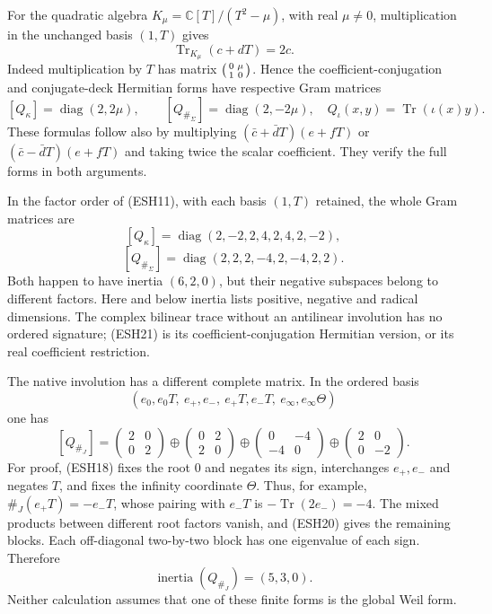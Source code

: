 \documentclass[
  10pt,
  a4paper,
]{article}
\begin{document}
For the quadratic algebra \(K_\mu=\mathbb C[T]/(T^2-\mu)\), with real
\(\mu\ne0\), multiplication in the unchanged basis \((1,T)\) gives \[
\operatorname{Tr}_{K_\mu}(c+dT)=2c.
\tag{ESH19}
\] Indeed multiplication by \(T\) has matrix
\(\begin{psmallmatrix}0&\mu\\1&0\end{psmallmatrix}\). Hence the
coefficient-conjugation and conjugate-deck Hermitian forms have
respective Gram matrices \[
[Q_\kappa]=\operatorname{diag}(2,2\mu),\qquad
[Q_{\#_\Sigma}]=\operatorname{diag}(2,-2\mu),
\quad Q_\iota(x,y)=\operatorname{Tr}(\iota(x)y).
\tag{ESH20}
\] These formulas follow also by multiplying \((\bar c+\bar dT)(e+fT)\)
or \((\bar c-\bar dT)(e+fT)\) and taking twice the scalar coefficient.
They verify the full forms in both arguments.

In the factor order of (ESH11), with each basis \((1,T)\) retained, the
whole Gram matrices are \[
[Q_\kappa]=\operatorname{diag}(2,-2,2,4,2,4,2,-2),
\tag{ESH21}
\] \[
[Q_{\#_\Sigma}]=\operatorname{diag}(2,2,2,-4,2,-4,2,2).
\tag{ESH22}
\] Both happen to have inertia \((6,2,0)\), but their negative subspaces
belong to different factors. Here and below inertia lists positive,
negative and radical dimensions. The complex bilinear trace without an
antilinear involution has no ordered signature; (ESH21) is its
coefficient-conjugation Hermitian version, or its real coefficient
restriction.

The native involution has a different complete matrix. In the ordered
basis \[
(e_0,e_0T,\ e_+,e_-,\ e_+T,e_-T,\ e_\infty,e_\infty\Theta)
\] one has \[
[Q_{\#_J}]=
\begin{pmatrix}2&0\\0&2\end{pmatrix}
\oplus\begin{pmatrix}0&2\\2&0\end{pmatrix}
\oplus\begin{pmatrix}0&-4\\-4&0\end{pmatrix}
\oplus\begin{pmatrix}2&0\\0&-2\end{pmatrix}.
\tag{ESH23}
\] For proof, (ESH18) fixes the root 0 and negates its sign,
interchanges \(e_+,e_-\) and negates \(T\), and fixes the infinity
coordinate \(\Theta\). Thus, for example, \(\#_J(e_+T)=-e_-T\), whose
pairing with \(e_-T\) is \(-\operatorname{Tr}(2e_-)=-4\). The mixed
products between different root factors vanish, and (ESH20) gives the
remaining blocks. Each off-diagonal two-by-two block has one eigenvalue
of each sign. Therefore \[
\operatorname{inertia}(Q_{\#_J})=(5,3,0).
\tag{ESH24}
\] Neither calculation assumes that one of these finite forms is the
global Weil form.
\end{document}
